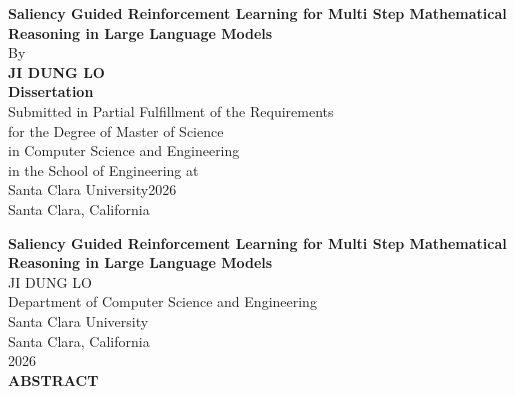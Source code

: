 \documentclass[12pt]{report}
\newcommand{\sixteenpt}{\fontsize{16pt}{19.2pt}\selectfont}
\newcommand{\fourteenpt}{\fontsize{14pt}{16.8pt}\selectfont}
\newcommand{\tenpt}{\fontsize{10pt}{12pt}\selectfont}
\begin{document}
\clearpage
\thispagestyle{plain}
\setcounter{page}{2}

\begin{center}
    \vspace*{1 in}
    {\sixteenpt\textbf{Saliency Guided Reinforcement Learning for Multi Step Mathematical Reasoning in Large Language Models}}\\[1cm]
    
    By\\[1cm]
    
    \textbf{JI DUNG LO}\\[3cm]
    
    \textbf{Dissertation}\\[2cm]
    
    Submitted in Partial Fulfillment of the Requirements\\
    for the Degree of Master of Science\\
    in Computer Science and Engineering\\
    in the School of Engineering at\\
    Santa Clara University\hspace{3mm}2026\\[2cm]
    
    Santa Clara, California
\end{center}







\clearpage
\thispagestyle{plain}

\begin{center}
    {\fourteenpt\textbf{Saliency Guided Reinforcement Learning for Multi Step Mathematical Reasoning in Large Language Models}}\\[1cm]
    
    {JI DUNG LO}\\[1cm]
    Department of Computer Science and Engineering\\
    Santa Clara University\\
    Santa Clara, California\\
    2026\\[1.5cm]
    
    \textbf{ABSTRACT}
    
\end{center}
\end{document}
